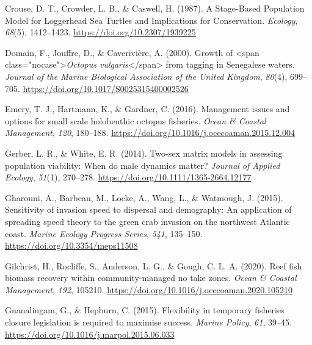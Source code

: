 \documentclass[
]{article}
\newlength{\cslhangindent}
\newlength{\cslentryspacingunit} %
\newenvironment{CSLReferences}[2] %
 {%
  \setlength{\parindent}{0pt}
  \ifodd #1
  \let\oldpar\par
  \def\par{\hangindent=\cslhangindent\oldpar}
  \fi
  \setlength{\parskip}{#2\cslentryspacingunit}
 }%
 {}
\begin{document}
\begin{CSLReferences}{1}{2}
\leavevmode{}%
Crouse, D. T., Crowder, L. B., \& Caswell, H. (1987). A {Stage}-{Based} {Population} {Model} for {Loggerhead} {Sea} {Turtles} and {Implications} for {Conservation}. \emph{Ecology}, \emph{68}(5), 1412--1423. \url{https://doi.org/10.2307/1939225}

\leavevmode{}%
Domain, F., Jouffre, D., \& Caverivière, A. (2000). Growth of {\textless{}}span class="nocase"{\textgreater{}}\emph{{Octopus} vulgaris}{\textless{}}/span{\textgreater{}} from tagging in {Senegalese} waters. \emph{Journal of the Marine Biological Association of the United Kingdom}, \emph{80}(4), 699--705. \url{https://doi.org/10.1017/S0025315400002526}

\leavevmode{}%
Emery, T. J., Hartmann, K., \& Gardner, C. (2016). Management issues and options for small scale holobenthic octopus fisheries. \emph{Ocean \& Coastal Management}, \emph{120}, 180--188. \url{https://doi.org/10.1016/j.ocecoaman.2015.12.004}

\leavevmode{}%
Gerber, L. R., \& White, E. R. (2014). Two-sex matrix models in assessing population viability: When do male dynamics matter? \emph{Journal of Applied Ecology}, \emph{51}(1), 270--278. \url{https://doi.org/10.1111/1365-2664.12177}

\leavevmode{}%
Gharouni, A., Barbeau, M., Locke, A., Wang, L., \& Watmough, J. (2015). Sensitivity of invasion speed to dispersal and demography: An application of spreading speed theory to the green crab invasion on the northwest {Atlantic} coast. \emph{Marine Ecology Progress Series}, \emph{541}, 135--150. \url{https://doi.org/10.3354/meps11508}

\leavevmode{}%
Gilchrist, H., Rocliffe, S., Anderson, L. G., \& Gough, C. L. A. (2020). Reef fish biomass recovery within community-managed no take zones. \emph{Ocean \& Coastal Management}, \emph{192}, 105210. \url{https://doi.org/10.1016/j.ocecoaman.2020.105210}

\leavevmode{}%
Gnanalingam, G., \& Hepburn, C. (2015). Flexibility in temporary fisheries closure legislation is required to maximise success. \emph{Marine Policy}, \emph{61}, 39--45. \url{https://doi.org/10.1016/j.marpol.2015.06.033}


\end{CSLReferences}
\end{document}
